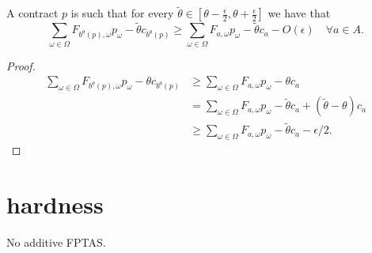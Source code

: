 \begin{lemma}
		
\end{lemma}

\begin{lemma}
	A contract $p$ is such that for every $\tilde \theta\in\left[\theta-\frac{\epsilon}{2},\theta+\frac{\epsilon}{2}\right]$ we have that 
	\[
	\sum_{\omega\in\Omega} F_{b^{ \theta}(p),\omega}p_\omega-{\tilde \theta c_{b^{ \theta}(p)}} \ge 	\sum_{\omega\in\Omega} F_{a,\omega}p_\omega-{\tilde \theta c_a }-O(\epsilon)\quad\forall a\in A.
	\]
\end{lemma}

\begin{proof}
	\begin{align}
		\sum_{\omega\in\Omega} F_{b^{ \theta}(p),\omega}p_\omega-{ \theta c_{b^{ \theta}(p)}} &\ge \sum_{\omega\in\Omega} F_{a,\omega}p_\omega-{ \theta c_{a}} \tag{definition of $b^\theta(p)$}\\
		&=\sum_{\omega\in\Omega} F_{a,\omega}p_\omega-{ \tilde\theta c_{a}} +(\tilde\theta-\theta)c_{a}\\
		&\ge \sum_{\omega\in\Omega} F_{a,\omega}p_\omega-{ \tilde\theta c_{a}} -\epsilon/2.
	\end{align}
\end{proof}










\section{hardness}


\begin{theorem}
	No additive FPTAS.
\end{theorem}


